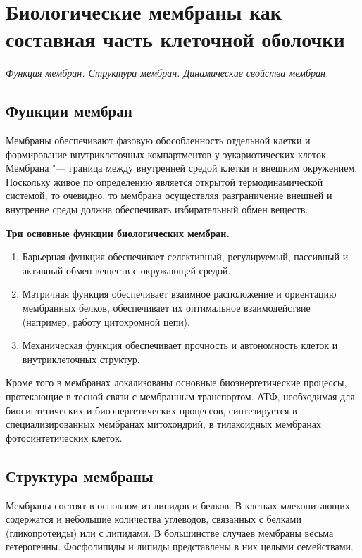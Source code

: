 \documentclass[12pt,a4paper,oneside]{book}
\begin{document}
\newpage
\section{Биологические мембраны как составная часть клеточной оболочки}
{\it  Функция мембран. Структура мембран. Динамические свойства мембран.}

\subsection{Функции мембран}

Мембраны обеспечивают фазовую обособленность отдельной клетки и формирование внутриклеточных компартментов у эукариотических клеток. Мембрана "--- граница между внутренней средой клетки и внешним окружением. Поскольку живое по определению является открытой термодинамической системой, то очевидно, то мембрана осуществляя разграничение внешней и внутренне среды должна обеспечивать избирательный обмен веществ. 

\textbf{Три основные функции биологических мембран.}

\begin{enumerate}
\item Барьерная функция обеспечивает селективный, регулируемый, пассивный и активный обмен веществ с окружающей средой.
\item Матричная функция обеспечивает взаимное расположение и ориентацию мембранных белков, обеспечивает их оптимальное взаимодействие (например, работу цитохромной цепи).
\item Механическая функция обеспечивает прочность и автономность клеток и внутриклеточных структур.
\end{enumerate}

Кроме того в мембранах локализованы основные биоэнергетические процессы, протекающие в тесной связи с мембранным транспортом. АТФ, необходимая для биосинтетических и биоэнергетических процессов, синтезируется в специализированных мембранах митохондрий, в тилакоидных мембранах фотосинтетических клеток. 

\subsection{Структура мембраны}

Мембраны состоят в основном из липидов и белков. В клетках млекопитающих содержатся и небольшие количества углеводов, связанных с белками (гликопротеиды) или с липидами. В большинстве случаев мембраны весьма гетерогенны. Фосфолипиды и липиды представлены в них целыми семействами.
\end{document}
